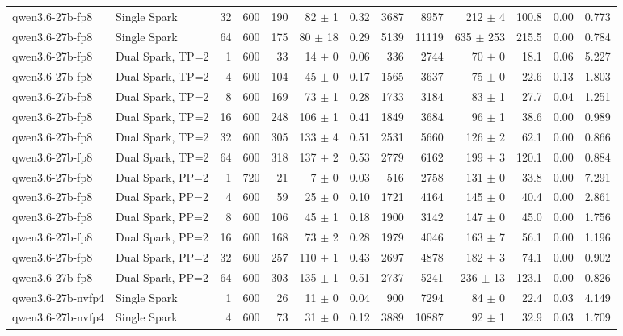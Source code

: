 \begin{tabular}{l l r r r r r r r r r r r}
qwen3.6-27b-fp8 & Single Spark & 32 & 600 & 190 & 82 $\pm$ 1 & 0.32 & 3687 & 8957 & 212 $\pm$ 4 & 100.8 & 0.00 & 0.773 \\
qwen3.6-27b-fp8 & Single Spark & 64 & 600 & 175 & 80 $\pm$ 18 & 0.29 & 5139 & 11119 & 635 $\pm$ 253 & 215.5 & 0.00 & 0.784 \\
\addlinespace
qwen3.6-27b-fp8 & Dual Spark, TP=2 & 1 & 600 & 33\rlap{$^\dagger$} & 14 $\pm$ 0 & 0.06 & 336 & 2744 & 70 $\pm$ 0 & 18.1 & 0.06 & 5.227 \\
qwen3.6-27b-fp8 & Dual Spark, TP=2 & 4 & 600 & 104 & 45 $\pm$ 0 & 0.17 & 1565 & 3637 & 75 $\pm$ 0 & 22.6 & 0.13 & 1.803 \\
qwen3.6-27b-fp8 & Dual Spark, TP=2 & 8 & 600 & 169 & 73 $\pm$ 1 & 0.28 & 1733 & 3184 & 83 $\pm$ 1 & 27.7 & 0.04 & 1.251 \\
qwen3.6-27b-fp8 & Dual Spark, TP=2 & 16 & 600 & 248 & 106 $\pm$ 1 & 0.41 & 1849 & 3684 & 96 $\pm$ 1 & 38.6 & 0.00 & 0.989 \\
qwen3.6-27b-fp8 & Dual Spark, TP=2 & 32 & 600 & 305 & 133 $\pm$ 4 & 0.51 & 2531 & 5660 & 126 $\pm$ 2 & 62.1 & 0.00 & 0.866 \\
qwen3.6-27b-fp8 & Dual Spark, TP=2 & 64 & 600 & 318 & 137 $\pm$ 2 & 0.53 & 2779 & 6162 & 199 $\pm$ 3 & 120.1 & 0.00 & 0.884 \\
\addlinespace
qwen3.6-27b-fp8 & Dual Spark, PP=2 & 1 & 720 & 21\rlap{$^\dagger$} & 7 $\pm$ 0 & 0.03 & 516 & 2758 & 131 $\pm$ 0 & 33.8 & 0.00 & 7.291 \\
qwen3.6-27b-fp8 & Dual Spark, PP=2 & 4 & 600 & 59\rlap{$^\dagger$} & 25 $\pm$ 0 & 0.10 & 1721 & 4164 & 145 $\pm$ 0 & 40.4 & 0.00 & 2.861 \\
qwen3.6-27b-fp8 & Dual Spark, PP=2 & 8 & 600 & 106 & 45 $\pm$ 1 & 0.18 & 1900 & 3142 & 147 $\pm$ 0 & 45.0 & 0.00 & 1.756 \\
qwen3.6-27b-fp8 & Dual Spark, PP=2 & 16 & 600 & 168 & 73 $\pm$ 2 & 0.28 & 1979 & 4046 & 163 $\pm$ 7 & 56.1 & 0.00 & 1.196 \\
qwen3.6-27b-fp8 & Dual Spark, PP=2 & 32 & 600 & 257 & 110 $\pm$ 1 & 0.43 & 2697 & 4878 & 182 $\pm$ 3 & 74.1 & 0.00 & 0.902 \\
qwen3.6-27b-fp8 & Dual Spark, PP=2 & 64 & 600 & 303 & 135 $\pm$ 1 & 0.51 & 2737 & 5241 & 236 $\pm$ 13 & 123.1 & 0.00 & 0.826 \\
\addlinespace
qwen3.6-27b-nvfp4 & Single Spark & 1 & 600 & 26\rlap{$^\dagger$} & 11 $\pm$ 0 & 0.04 & 900 & 7294 & 84 $\pm$ 0 & 22.4 & 0.03 & 4.149 \\
qwen3.6-27b-nvfp4 & Single Spark & 4 & 600 & 73\rlap{$^\dagger$} & 31 $\pm$ 0 & 0.12 & 3889 & 10887 & 92 $\pm$ 1 & 32.9 & 0.03 & 1.709 \\

\end{tabular}

